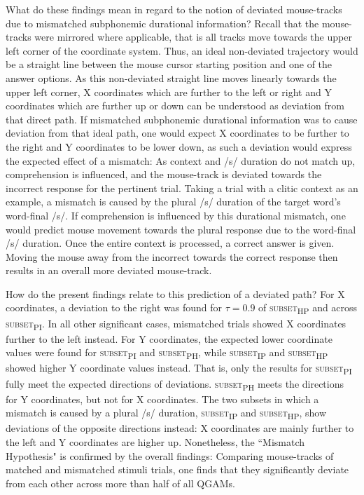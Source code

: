 What do these findings mean in regard to the notion of deviated mouse-tracks due to mismatched subphonemic durational information? Recall that the mouse-tracks were mirrored where applicable, that is all tracks move towards the upper left corner of the coordinate system. Thus, an ideal non-deviated trajectory would be a straight line between the mouse cursor starting position and one of the answer options. As this non-deviated straight line moves linearly towards the upper left corner, X coordinates which are further to the left or right and Y coordinates which are further up or down can be understood as deviation from that direct path. If mismatched subphonemic durational information was to cause deviation from that ideal path, one would expect X coordinates to be further to the right and Y coordinates to be lower down, as such a deviation would express the expected effect of a mismatch: As context and /s/ duration do not match up, comprehension is influenced, and the mouse-track is deviated towards the incorrect response for the pertinent trial. Taking a trial with a clitic context as an example, a mismatch is caused by the plural /s/ duration of the target word’s word-final /s/. If comprehension is influenced by this durational mismatch, one would predict mouse movement towards the plural response due to the word-final /s/ duration. Once the entire context is processed, a correct answer is given. Moving the mouse away from the incorrect towards the correct response then results in an overall more deviated mouse-track.

How do the present findings relate to this prediction of a deviated path? For X coordinates, a deviation to the right was found for $\tau=0.9$ of \textsc{subset\textsubscript{HP}} and across \textsc{subset\textsubscript{PI}}. In all other significant cases, mismatched trials showed X coordinates further to the left instead. For Y coordinates, the expected lower coordinate values were found for \textsc{subset\textsubscript{PI}} and \textsc{subset\textsubscript{PH}}, while \textsc{subset\textsubscript{IP}} and \textsc{subset\textsubscript{HP}} showed higher Y coordinate values instead. That is, only the results for \textsc{subset\textsubscript{PI}} fully meet the expected directions of deviations. \textsc{subset\textsubscript{PH}} meets the directions for Y coordinates, but not for X coordinates. The two subsets in which a mismatch is caused by a plural /s/ duration, \textsc{subset\textsubscript{IP}} and \textsc{subset\textsubscript{HP}}, show deviations of the opposite directions instead: X coordinates are mainly further to the left and Y coordinates are higher up. Nonetheless, the ``Mismatch Hypothesis" is confirmed by the overall findings: Comparing mouse-tracks of matched and mismatched stimuli trials, one finds that they significantly deviate from each other across more than half of all QGAMs. 

